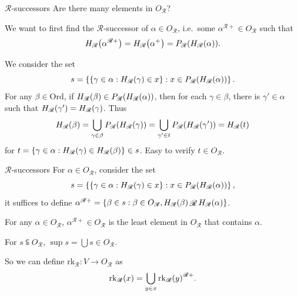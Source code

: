\documentclass{beamer}
\newcommand{\Ord}{\mathrm{Ord}}
\begin{document}
\begin{frame}{$\mathscr{R}$-successors}
  Are there many elements in $O_\mathscr{R}$?

  \vspace{0.4em}

  We want to first find the $\mathscr{R}$-successor of $\alpha \in O_\mathscr{R}$, i.e.\ some $\alpha^{\mathscr{R}+} \in O_\mathscr{R}$ such that
  \[H_\mathscr{R}\mleft(\alpha^{\mathscr{R}+}\mright) = H_\mathscr{R}\mleft(\alpha^+\mright) = P_\mathscr{R}\mleft(H_\mathscr{R}\mleft(\alpha\mright)\mright).\]

  \pause

  \vspace{0.4em}

  We consider the set
  \[s = \left\{\left\{\gamma \in \alpha : H_\mathscr{R}\mleft(\gamma\mright) \in x\right\} : x \in P_\mathscr{R}\mleft(H_\mathscr{R}\mleft(\alpha\mright)\mright)\right\}.\]
  For any $\beta \in \Ord$, if $H_\mathscr{R}\mleft(\beta\mright) \in P_\mathscr{R}\mleft(H_\mathscr{R}\mleft(\alpha\mright)\mright)$, then for each $\gamma \in \beta$, there is $\gamma' \in \alpha$ such that $H_\mathscr{R}\mleft(\gamma'\mright) = H_\mathscr{R}\mleft(\gamma\mright)$. Thus
  \[H_\mathscr{R}\mleft(\beta\mright) = \bigcup_{\gamma \in \beta} P_\mathscr{R}\mleft(H_\mathscr{R}\mleft(\gamma\mright)\mright) = \bigcup_{\gamma' \in t} P_\mathscr{R}\mleft(H_\mathscr{R}\mleft(\gamma'\mright)\mright) = H_\mathscr{R}\mleft(t\mright)\]
  for $t = \left\{\gamma \in \alpha : H_\mathscr{R}\mleft(\gamma\mright) \in H_\mathscr{R}\mleft(\beta\mright)\right\} \in s$. Easy to verify $t \in O_\mathscr{R}$.
\end{frame}

\begin{frame}{$\mathscr{R}$-successors}
  For $\alpha \in O_\mathscr{R}$, consider the set
  \[s = \left\{\left\{\gamma \in \alpha : H_\mathscr{R}\mleft(\gamma\mright) \in x\right\} : x \in P_\mathscr{R}\mleft(H_\mathscr{R}\mleft(\alpha\mright)\mright)\right\},\]
  it suffices to define $\alpha^{\mathscr{R}+} = \left\{\beta \in s : \beta \in O_\mathscr{R}, H_\mathscr{R}\mleft(\beta\mright) \mathop{\mathscr{R}} H_\mathscr{R}\mleft(\alpha\mright)\right\}$.

  \begin{lemma}
    For any $\alpha \in O_\mathscr{R}$, $\alpha^{\mathscr{R}+} \in O_\mathscr{R}$ is the least element in $O_\mathscr{R}$ that contains $\alpha$.
  \end{lemma}

  \pause

  \begin{lemma}
    For $s \subseteqq O_\mathscr{R}$, $\sup s = \bigcup s \in O_\mathscr{R}$.
  \end{lemma}

  \vspace{0.4em}

  So we can define $\mathrm{rk}_\mathscr{R} : V \rightarrow O_\mathscr{R}$ as
  \[\mathrm{rk}_\mathscr{R}\mleft(x\mright) = \bigcup_{y \in x} \mathrm{rk}_\mathscr{R}\mleft(y\mright)^{\mathscr{R}+}.\]
\end{frame}
\end{document}
